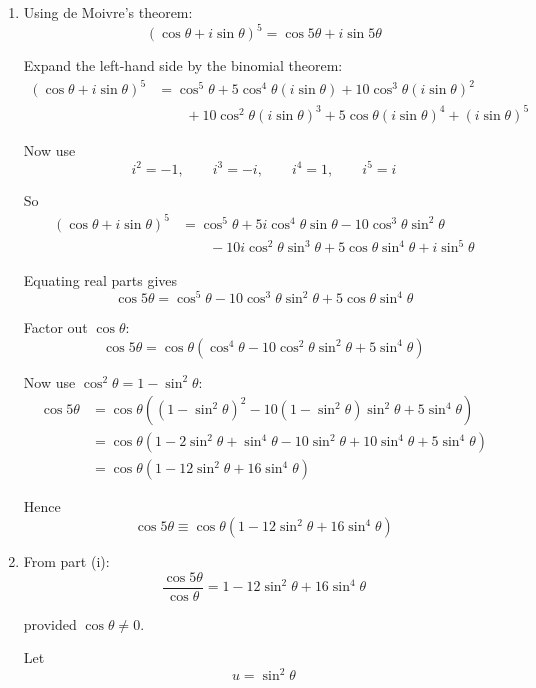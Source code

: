 \documentclass[leqno]{article}
\begin{document}
\begin{enumerate}[
  label=\textbf{\arabic*.},
  leftmargin=*,
  topsep=0pt,
  partopsep=0pt,
  parsep=0pt
]
\vspace*{10pt}

\begin{djsSolution}
\begin{enumerate}[label=\textbf{(\roman*)}]
  \item Using de Moivre's theorem:
\[
(\cos \theta+i\sin \theta)^5=\cos 5\theta+i\sin 5\theta
\]

Expand the left-hand side by the binomial theorem:
\begin{align*}
(\cos \theta+i\sin \theta)^5
&= \cos^5\theta + 5\cos^4\theta(i\sin\theta)
+10\cos^3\theta(i\sin\theta)^2 \\
&\qquad +10\cos^2\theta(i\sin\theta)^3
+5\cos\theta(i\sin\theta)^4
+(i\sin\theta)^5
\end{align*}

Now use
\[
i^2=-1,\qquad i^3=-i,\qquad i^4=1,\qquad i^5=i
\]

So
\begin{align*}
(\cos \theta+i\sin \theta)^5
&= \cos^5\theta + 5i\cos^4\theta\sin\theta
-10\cos^3\theta\sin^2\theta \\
&\qquad -10i\cos^2\theta\sin^3\theta
+5\cos\theta\sin^4\theta
+i\sin^5\theta
\end{align*}

Equating real parts gives
\[
\cos 5\theta=\cos^5\theta-10\cos^3\theta\sin^2\theta+5\cos\theta\sin^4\theta
\]

Factor out $\cos\theta$:
\[
\cos 5\theta=\cos\theta\left(\cos^4\theta-10\cos^2\theta\sin^2\theta+5\sin^4\theta\right)
\]

Now use $\cos^2\theta=1-\sin^2\theta$:
\begin{align*}
\cos 5\theta
&= \cos\theta\left((1-\sin^2\theta)^2-10(1-\sin^2\theta)\sin^2\theta+5\sin^4\theta\right) \\
&= \cos\theta\left(1-2\sin^2\theta+\sin^4\theta-10\sin^2\theta+10\sin^4\theta+5\sin^4\theta\right) \\
&= \cos\theta\left(1-12\sin^2\theta+16\sin^4\theta\right)
\end{align*}

Hence
\[
\cos 5\theta \equiv \cos \theta \left(1 - 12\sin^2 \theta + 16\sin^4 \theta\right)
\]

  \item From part (i):
\[
\frac{\cos 5\theta}{\cos\theta}=1-12\sin^2\theta+16\sin^4\theta
\]

provided $\cos\theta\ne 0$.

Let
\[
u=\sin^2\theta
\]


\end{enumerate}
\end{djsSolution}
\end{enumerate}
\end{document}
